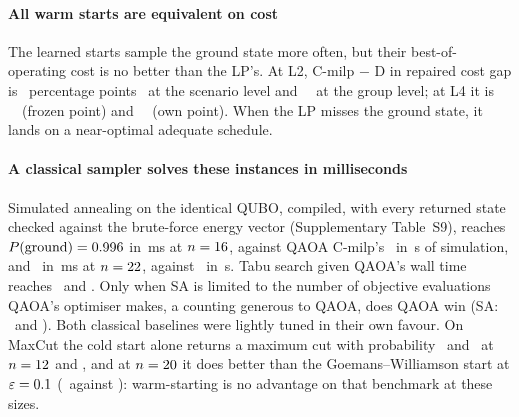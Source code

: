 \paragraph{All warm starts are equivalent on cost} The learned starts sample the ground state more often, but their best-of-\KMax operating cost is no better than the LP's. At L2, C-milp $-$ D in repaired cost gap is \GapCmilpMinusD\ percentage points \GapCmilpMinusDCI\ at the scenario level and \GapCmilpMinusDGL\ \GapCmilpMinusDGLCI\ at the group level; at L4 it is \LfourFrzGapCmilpMinusD\ \LfourFrzGapCmilpMinusDCI\ (frozen point) and \LfourOwnGapCmilpMinusD\ \LfourOwnGapCmilpMinusDCI\ (own point). When the LP misses the ground state, it lands on a near-optimal adequate schedule.

\paragraph{A classical sampler solves these instances in milliseconds} Simulated annealing on the identical QUBO, compiled, with every returned state checked against the brute-force energy vector (Supplementary Table~S9), reaches $P(\text{ground})=0.996$ in \SAmsLtwoEFive\,ms at $n=16$, against QAOA C-milp's \QAOAPgndLtwo\ in \QAOATimeLtwo\,s of simulation, and \SAPgndLfourESix\ in \SAmsLfourESix\,ms at $n=22$, against \QAOAPgndLfour\ in \QAOATimeLfour\,s. Tabu search given QAOA's wall time reaches \TabuPgndLtwo\ and \TabuPgndLfour. Only when SA is limited to the number of objective evaluations QAOA's optimiser makes, a counting generous to QAOA, does QAOA win (SA: \SAPgndEvalLtwo\ and \SAPgndEvalLfour). Both classical baselines were lightly tuned in their own favour. On MaxCut the cold start alone returns a maximum cut with probability \MCColdTwelve\ and \MCColdSixteen\ at $n=12$ and \MCSizeSixteen, and at $n=20$ it does better than the Goemans--Williamson start at $\varepsilon=0.1$ (\MCColdTwenty\ against \MCGWTwenty): warm-starting is no advantage on that benchmark at these sizes.
